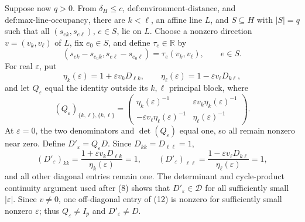 Suppose now \(q>0\).  From \(\delta_H\le c\), \(\text{def:environment-distance}\), and \(\text{def:max-line-occupancy}\), there are \(k<\ell\), an affine line \(L\), and \(S\subseteq H\) with \(|S|=q\) such that all \((s_{ek},s_{e\ell})\), \(e\in S\), lie on \(L\).  Choose a nonzero direction \(v=(v_k,v_\ell)\) of \(L\), fix \(e_0\in S\), and define \(\tau_e\in\mathbb R\) by
\[
 (s_{ek}-s_{e_0k},s_{e\ell}-s_{e_0\ell})
 =\tau_e(v_k,v_\ell),\qquad e\in S. \tag{10}
\]
For real \(\varepsilon\), put
\[
 \eta_k(\varepsilon)=1+\varepsilon v_kD_{\ell k},
 \qquad
 \eta_\ell(\varepsilon)=1-\varepsilon v_\ell D_{k\ell}, \tag{11}
\]
and let \(Q_\varepsilon\) equal the identity outside its \(k,\ell\) principal block, where
\[
 (Q_\varepsilon)_{\{k,\ell\},\{k,\ell\}}
 =\begin{pmatrix}
 \eta_k(\varepsilon)^{-1}&\varepsilon v_k\eta_k(\varepsilon)^{-1}\\
 -\varepsilon v_\ell\eta_\ell(\varepsilon)^{-1}&\eta_\ell(\varepsilon)^{-1}
 \end{pmatrix}. \tag{12}
\]
At \(\varepsilon=0\), the two denominators and \(\det(Q_\varepsilon)\) equal one, so all remain nonzero near zero.  Define \(D'_\varepsilon=Q_\varepsilon D\).  Since \(D_{kk}=D_{\ell\ell}=1\),
\[
 (D'_\varepsilon)_{kk}
 =\frac{1+\varepsilon v_kD_{\ell k}}{\eta_k(\varepsilon)}=1,
 \qquad
 (D'_\varepsilon)_{\ell\ell}
 =\frac{1-\varepsilon v_\ell D_{k\ell}}{\eta_\ell(\varepsilon)}=1, \tag{13}
\]
and all other diagonal entries remain one.  The determinant and cycle-product continuity argument used after (8) shows that \(D'_\varepsilon\in\mathcal D\) for all sufficiently small \(|\varepsilon|\).  Since \(v\ne0\), one off-diagonal entry of (12) is nonzero for sufficiently small nonzero \(\varepsilon\); thus \(Q_\varepsilon\ne I_p\) and \(D'_\varepsilon\ne D\).

